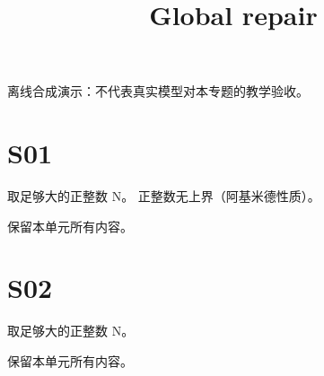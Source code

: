 \documentclass[UTF8,fontset=fandol,11pt]{ctexart}
\title{Global repair}
\date{}
\begin{document}
\maketitle
\par\noindent 离线合成演示：不代表真实模型对本专题的教学验收。\par
\section{S01}\label{sec:S01}
取足够大的正整数 N。 正整数无上界（阿基米德性质）。\par
保留本单元所有内容。\par
\section{S02}\label{sec:S02}
取足够大的正整数 N。\par
保留本单元所有内容。\par
\end{document}
